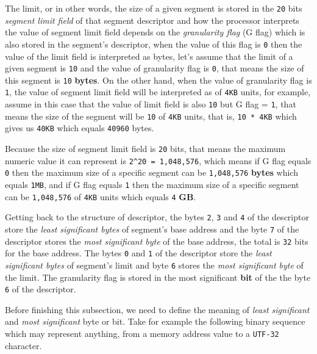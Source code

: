 The limit, or in other words, the size of a given segment is stored in
the \lstinline!20! bits \emph{segment limit field} of that segment
descriptor and how the processor interprets the value of segment limit
field depends on the \emph{granularity flag} (G flag) which is also
stored in the segment's descriptor, when the value of this flag is
\lstinline!0! then the value of the limit field is interpreted as bytes,
let's assume that the limit of a given segment is \lstinline!10! and the
value of granularity flag is \lstinline!0!, that means the size of this
segment is \lstinline!10! \textbf{bytes}. On the other hand, when the
value of granularity flag is \lstinline!1!, the value of segment limit
field will be interpreted as of \lstinline!4KB! units, for example,
assume in this case that the value of limit field is also \lstinline!10!
but G flag = \lstinline!1!, that means the size of the segment will be
\lstinline!10! of \lstinline!4KB! units, that is, \lstinline!10 * 4KB!
which gives us \lstinline!40KB! which equals \lstinline!40960! bytes.

Because the size of segment limit field is \lstinline!20! bits, that
means the maximum numeric value it can represent is
\lstinline!2^20 = 1,048,576!, which means if G flag equals \lstinline!0!
then the maximum size of a specific segment can be \lstinline!1,048,576!
\textbf{bytes} which equals \lstinline!1MB!, and if G flag equals
\lstinline!1! then the maximum size of a specific segment can be
\lstinline!1,048,576! of \lstinline!4KB! units which equals
\lstinline!4! \textbf{GB}.

Getting back to the structure of descriptor, the bytes \lstinline!2!,
\lstinline!3! and \lstinline!4! of the descriptor store the \emph{least
significant bytes} of segment's base address and the byte \lstinline!7!
of the descriptor stores the \emph{most significant byte} of the base
address, the total is \lstinline!32! bits for the base address. The
bytes \lstinline!0! and \lstinline!1! of the descriptor store the
\emph{least significant bytes} of segment's limit and byte \lstinline!6!
stores the \emph{most significant byte} of the limit. The granularity
flag is stored in the most significant \textbf{bit} of the the byte
\lstinline!6! of the descriptor.

Before finishing this subsection, we need to define the meaning of
\emph{least significant} and \emph{most significant} byte or bit. Take
for example the following binary sequence which may represent anything,
from a memory address value to a \lstinline!UTF-32! character.

